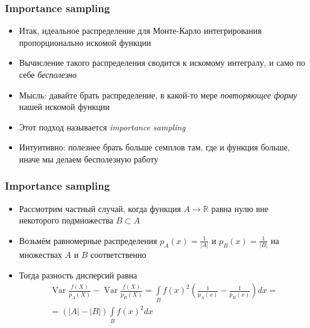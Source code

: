 \documentclass[10pt]{beamer}
\begin{document}
\begin{frame}
\frametitle{Importance sampling}
\begin{itemize}
\item Итак, идеальное распределение для Монте-Карло интегрирования пропорционально искомой функции
\pause
\item Вычисление такого распределения сводится к искомому интегралу, и само по себе \textit{бесполезно}
\pause
\item Мысль: давайте брать распределение, в какой-то мере \textit{повторяющее форму} нашей искомой функции
\pause
\item Этот подход называется \textit{importance sampling}
\pause
\item Интуитивно: полезнее брать больше семплов там, где и функция больше, иначе мы делаем бесполезную работу
\end{itemize}
\end{frame}

\begin{frame}
\frametitle{Importance sampling}
\begin{itemize}
\item Рассмотрим частный случай, когда функция \begin{math}A\rightarrow \mathbb R\end{math} равна нулю вне некоторого подмножества \begin{math}B\subset A\end{math}
\pause
\item Возьмём равномерные распределения \begin{math}p_A(x)=\frac{1}{|A|}\end{math} и \begin{math}p_B(x)=\frac{1}{|B|}\end{math} на множествах \begin{math}A\end{math} и \begin{math}B\end{math} соответственно
\pause
\item Тогда разность дисперсий равна
\begin{gather*}
\operatorname{Var}\frac{f(X)}{p_A(X)} - \operatorname{Var}\frac{f(X)}{p_B(X)} = \int\limits_B f(x)^2 \left(\frac{1}{p_A(x)} - \frac{1}{p_B(x)}\right)dx = \\
= (|A| - |B|) \int\limits_B f(x)^2 dx
\end{gather*}
\end{itemize}
\end{frame}
\end{document}
